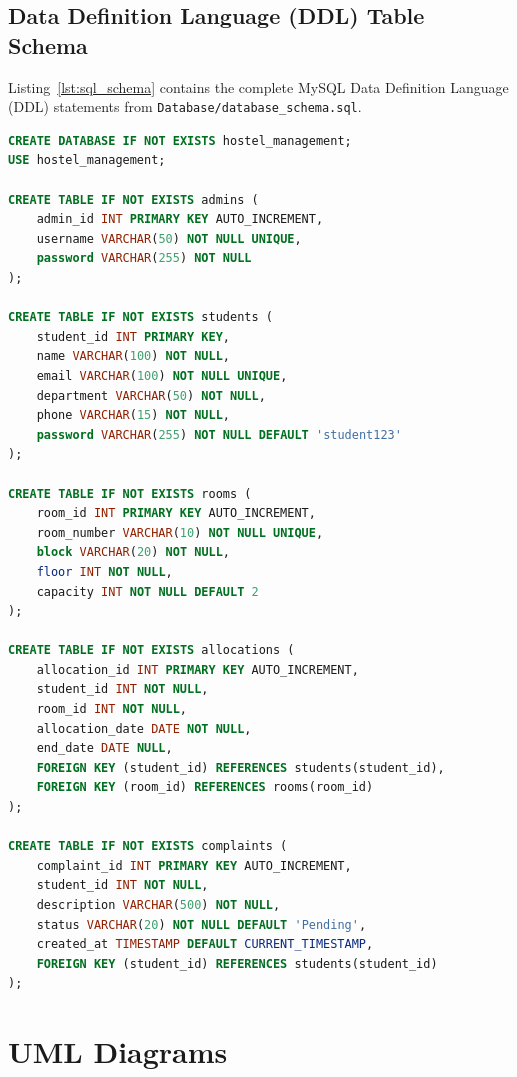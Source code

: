\documentclass[12pt,a4paper]{article}
\begin{document}
\subsection{Data Definition Language (DDL) Table Schema}
\label{sec:ddl}
Listing~\ref{lst:sql_schema} contains the complete MySQL Data Definition Language (DDL) statements from \texttt{Database/database\_schema.sql}.

\begin{lstlisting}[language=SQL, caption={Relational DDL Table Schema Definitions (\texttt{Database/database\_schema.sql})}, label={lst:sql_schema}]
CREATE DATABASE IF NOT EXISTS hostel_management;
USE hostel_management;

CREATE TABLE IF NOT EXISTS admins (
    admin_id INT PRIMARY KEY AUTO_INCREMENT,
    username VARCHAR(50) NOT NULL UNIQUE,
    password VARCHAR(255) NOT NULL
);

CREATE TABLE IF NOT EXISTS students (
    student_id INT PRIMARY KEY,
    name VARCHAR(100) NOT NULL,
    email VARCHAR(100) NOT NULL UNIQUE,
    department VARCHAR(50) NOT NULL,
    phone VARCHAR(15) NOT NULL,
    password VARCHAR(255) NOT NULL DEFAULT 'student123'
);

CREATE TABLE IF NOT EXISTS rooms (
    room_id INT PRIMARY KEY AUTO_INCREMENT,
    room_number VARCHAR(10) NOT NULL UNIQUE,
    block VARCHAR(20) NOT NULL,
    floor INT NOT NULL,
    capacity INT NOT NULL DEFAULT 2
);

CREATE TABLE IF NOT EXISTS allocations (
    allocation_id INT PRIMARY KEY AUTO_INCREMENT,
    student_id INT NOT NULL,
    room_id INT NOT NULL,
    allocation_date DATE NOT NULL,
    end_date DATE NULL,
    FOREIGN KEY (student_id) REFERENCES students(student_id),
    FOREIGN KEY (room_id) REFERENCES rooms(room_id)
);

CREATE TABLE IF NOT EXISTS complaints (
    complaint_id INT PRIMARY KEY AUTO_INCREMENT,
    student_id INT NOT NULL,
    description VARCHAR(500) NOT NULL,
    status VARCHAR(20) NOT NULL DEFAULT 'Pending',
    created_at TIMESTAMP DEFAULT CURRENT_TIMESTAMP,
    FOREIGN KEY (student_id) REFERENCES students(student_id)
);
\end{lstlisting}

\section{UML Diagrams}
\label{sec:uml}
\end{document}
